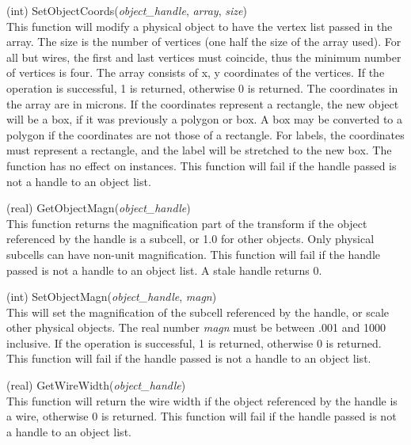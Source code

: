 \begin{description}
\item{(int) \vt SetObjectCoords({\it object\_handle\/}, {\it array\/},
 {\it size\/})}\\
This function will modify a physical object to have the vertex list
passed in the array.  The size is the number of vertices (one half the
size of the array used).  For all but wires, the first and last
vertices must coincide, thus the minimum number of vertices is four. 
The array consists of x, y coordinates of the vertices.  If the
operation is successful, 1 is returned, otherwise 0 is returned.  The
coordinates in the array are in microns.  If the coordinates represent
a rectangle, the new object will be a box, if it was previously a
polygon or box.  A box may be converted to a polygon if the
coordinates are not those of a rectangle.  For labels, the coordinates
must represent a rectangle, and the label will be stretched to the new
box.  The function has no effect on instances.  This function will
fail if the handle passed is not a handle to an object list.

\item{(real) \vt GetObjectMagn({\it object\_handle\/})}\\
This function returns the magnification part of the transform if the
object referenced by the handle is a subcell, or 1.0 for other
objects.  Only physical subcells can have non-unit magnification. 
This function will fail if the handle passed is not a handle to an
object list.  A stale handle returns 0.

\item{(int) \vt SetObjectMagn({\it object\_handle\/}, {\it magn\/})}\\
This will set the magnification of the subcell referenced by the
handle, or scale other physical objects.  The real number {\it magn}
must be between .001 and 1000 inclusive.  If the operation is
successful, 1 is returned, otherwise 0 is returned.  This function
will fail if the handle passed is not a handle to an object list.

\item{(real) \vt GetWireWidth({\it object\_handle\/})}\\
This function will return the wire width if the object referenced by
the handle is a wire, otherwise 0 is returned.  This function will
fail if the handle passed is not a handle to an object list.


\end{description}
